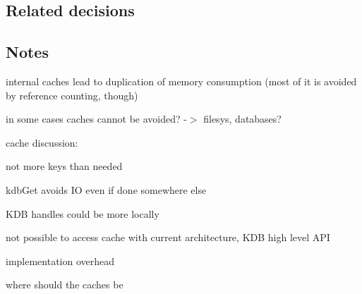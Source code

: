 \subsection*{Related decisions}

\subsection*{Notes}

internal caches lead to duplication of memory consumption (most of it is avoided by reference counting, though)

in some cases caches cannot be avoided? -\/$>$ filesys, databases?

cache discussion\+:
\begin{DoxyItemize}
\item not more keys than needed
\item kdb\+Get avoids IO even if done somewhere else
\item K\+DB handles could be more locally
\item not possible to access cache with current architecture, K\+DB high level A\+PI
\item implementation overhead
\item where should the caches be 
\end{DoxyItemize}